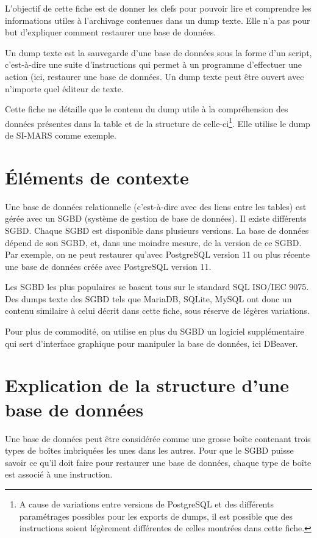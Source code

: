 L'objectif de cette fiche est de donner les clefs pour pouvoir lire et
comprendre les informations utiles à l'archivage contenues dans un dump
texte. Elle n'a pas pour but d'expliquer comment restaurer une base de
données.

Un dump texte est la sauvegarde d'une base de données sous la forme d'un
script, c'est-à-dire une suite d'instructions qui permet à un programme
d'effectuer une action (ici, restaurer une base de données. Un dump
texte peut être ouvert avec n'importe quel éditeur de texte.

Cette fiche ne détaille que le contenu du dump utile à la compréhension des données présentes dans la table et de la structure de celle-ci\footnote{A cause de variations entre versions de PostgreSQL et des différents paramétrages possibles pour les exports de dumps, il est possible que des instructions soient légèrement différentes de celles montrées dans cette fiche.}. Elle utilise le dump de SI-MARS comme exemple.

\section*{Éléments de contexte}

Une base de données relationnelle (c'est-à-dire avec des liens entre les
tables) est gérée avec un SGBD (système de gestion de base de données).
Il existe différents SGBD. Chaque SGBD est disponible dans plusieurs
versions. La base de données dépend de son SGBD, et, dans une moindre
mesure, de la version de ce SGBD. Par exemple, on ne peut restaurer
qu'avec PostgreSQL version 11 ou plus récente une base de données créée
avec PostgreSQL version 11.

Les SGBD les plus populaires se basent tous sur le standard SQL ISO/IEC
9075. Des dumps texte des SGBD tels que MariaDB, SQLite, MySQL ont donc
un contenu similaire à celui décrit dans cette fiche, sous réserve de
légères variations.

Pour plus de commodité, on utilise en plus du SGBD un logiciel
supplémentaire qui sert d'interface graphique pour manipuler la base de
données, ici DBeaver.

\section*{Explication de la structure d'une base de données}

Une base de données peut être considérée comme une grosse boîte
contenant trois types de boîtes imbriquées les unes dans les autres.
Pour que le SGBD puisse savoir ce qu'il doit faire pour restaurer une
base de données, chaque type de boîte est associé à une instruction.

